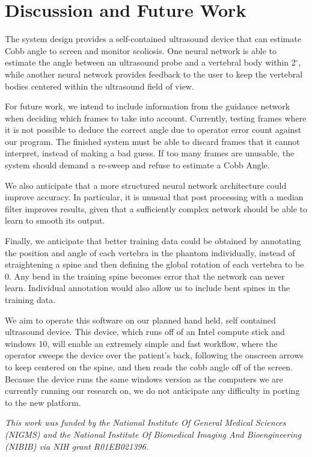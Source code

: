 \documentclass{article}
\begin{document}
\section{Discussion and Future Work}
The system design provides a self-contained ultrasound device that can estimate Cobb angle to screen and monitor scoliosis.  One neural network is able to estimate the angle between an ultrasound probe and a vertebral body within 2$^\circ$, while another neural network provides feedback to the user to keep the vertebral bodies centered within the ultrasound field of view.  

For future work, we intend to include information from the guidance network when deciding which frames to take into account. Currently, testing frames where it is not possible to deduce the correct angle due to operator error count against our program. The finished system must be able to discard frames that it cannot interpret, instead of making a bad guess. If too many frames are unusable, the system should demand a re-sweep and refuse to estimate a Cobb Angle.

We also anticipate that a more structured neural network architecture could improve accuracy. In particular, it is unusual that post processing  with a median filter improves results, given that a sufficiently complex network should be able to learn to smooth its output. 

Finally, we anticipate that better training data could be obtained by annotating the position and angle of each vertebra in the phantom individually, instead of straightening a spine and then defining the global rotation of each vertebra to be 0. Any bend in the training spine becomes error that the network can never learn. Individual annotation would also allow us to include bent spines in the training data.

We aim to operate this software on our planned hand held, self contained ultrasound device. This device, which runs off of an Intel compute stick and windows 10, will enable an extremely simple and fast workflow, where the operator sweeps the device over the patient’s back, following the onscreen arrows to keep centered on the spine, and then reads the cobb angle off of the screen. Because the device runs the same windows version as the computers we are currently running our research on, we do not anticipate any difficulty in porting to the new platform.

\bigskip
\emph{ This work was funded by the National Institute Of General Medical Sciences (NIGMS) and the National Institute Of Biomedical Imaging And Bioengineering (NIBIB) via NIH grant R01EB021396.}
\end{document}

